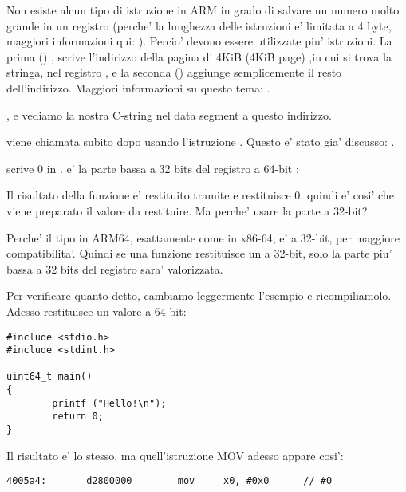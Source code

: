 Non esiste alcun tipo di istruzione in ARM in grado di salvare un numero molto grande in un registro (perche' la lunghezza delle
istruzioni e' limitata a 4 byte, maggiori informazioni qui: ).
Percio' devono essere utilizzate piu' istruzioni. La prima () , scrive l'indirizzo della pagina di 4KiB (4KiB page)
,in cui si trova la stringa, nel registro , e la seconda (\ADD) aggiunge semplicemente il resto dell'indirizzo.
Maggiori informazioni su questo tema: .

, e vediamo la nostra C-string  nel  data segment a questo indirizzo.


\puts viene chiamata subito dopo usando l'istruzione . Questo e' stato gia' discusso: .

\MOV scrive 0 in . 
 e' la parte bassa a 32 bits del registro a 64-bit :



Il risultato della funzione e' restituito tramite  e \main restituisce 0, quindi e' cosi' che viene preparato 
il valore da restituire.
Ma perche' usare la parte a 32-bit?

Perche' il tipo \Tint in ARM64, esattamente come in x86-64, e' a 32-bit, per maggiore compatibilita'.
Quindi se una funzione restituisce un \Tint a 32-bit, solo la parte piu' bassa a 32 bits del registro  sara' valorizzata.

Per verificare quanto detto, cambiamo leggermente l'esempio e ricompiliamolo.
Adesso \main restituisce un valore a 64-bit:

\begin{lstlisting}[caption=\main returning a value of \TT{uint64\_t} type]
#include <stdio.h>
#include <stdint.h>

uint64_t main()
{
        printf ("Hello!\n");
        return 0;
}
\end{lstlisting}

Il risultato e' lo stesso, ma quell'istruzione MOV adesso appare cosi': 

\begin{lstlisting}[caption=\NonOptimizing GCC 4.8.1 + objdump]
  4005a4:       d2800000        mov     x0, #0x0      // #0
\end{lstlisting}


